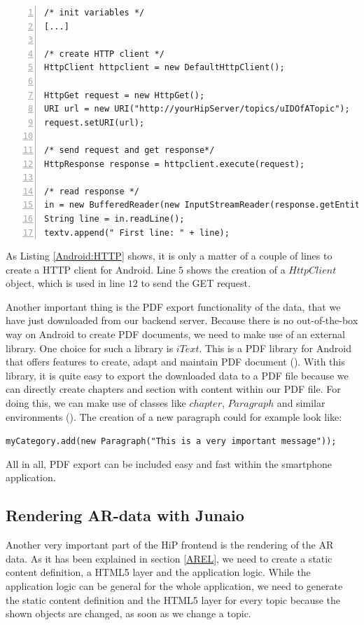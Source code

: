 \begin{lstlisting}[numbers=left,caption={Creation and usage of an Android HTTP client},label=Android:HTTP,frame=tlbr,breaklines]
/* init variables */
[...]

/* create HTTP client */
HttpClient httpclient = new DefaultHttpClient();

HttpGet request = new HttpGet();
URI url = new URI("http://yourHipServer/topics/uIDOfATopic");
request.setURI(url);

/* send request and get response*/
HttpResponse response = httpclient.execute(request);

/* read response */
in = new BufferedReader(new InputStreamReader(response.getEntity().getContent()));
String line = in.readLine();
textv.append(" First line: " + line);
\end{lstlisting}

As Listing \ref{Android:HTTP} shows, it is only a matter of a couple of lines to create a \ac{HTTP} client for Android. Line $5$ shows the creation of a $HttpClient$ object, which is used in line $12$ to send the GET request.

Another important thing is the \ac{PDF} export functionality of the data, that we have just downloaded from our backend server.
Because there is no out-of-the-box way on Android to create \ac{PDF} documents, we need to make use of an external library. One choice for such a library is $iText$. This is a \ac{PDF} library for Android that offers features to create, adapt and maintain \ac{PDF} document (\cite{itext2015}).
With this library, it is quite easy to export the downloaded data to a \ac{PDF} file because we can directly create chapters and section with content within our \ac{PDF} file. For doing this, we can make use of classes like $chapter$, $Paragraph$ and similar environments (\cite{pdfCreation}). The creation of a new paragraph could for example look like:

\verb|myCategory.add(new Paragraph("This is a very important message"));|  

All in all, \ac{PDF} export can be included easy and fast within the smartphone application.

\subsection{Rendering AR-data with Junaio}
Another very important part of the \ac{HiP} frontend is the rendering of the \ac{AR} data. As it has been explained in section \ref{AREL}, we need to create a static content definition, a \ac{HTML5} layer and the application logic. While the application logic can be general for the whole application, we need to generate the static content definition and the \ac{HTML5} layer for every topic because the shown objects are changed, as soon as we change a topic.
 

